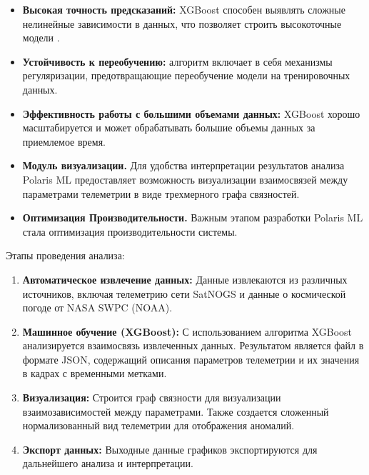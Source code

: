 \documentclass[14pt, a4paper]{extreport}
\begin{document}
    \begin{itemize}
        \item \textbf{Высокая точность предсказаний:} XGBoost способен выявлять сложные нелинейные зависимости в данных, что позволяет строить высокоточные модели \cite{behaviour_based_anomaly_detection}.
        \item \textbf{Устойчивость к переобучению:} алгоритм включает в себя механизмы регуляризации, предотвращающие переобучение модели на тренировочных данных.
        \item \textbf{Эффективность работы с большими объемами данных:} XGBoost хорошо масштабируется и может обрабатывать большие объемы данных за приемлемое время.
        \item \textbf{Модуль визуализации.} Для удобства интерпретации результатов анализа Polaris ML предоставляет возможность визуализации взаимосвязей между параметрами телеметрии в виде трехмерного графа связностей.
        \item \textbf{Оптимизация Производительности.} Важным этапом разработки Polaris ML стала оптимизация производительности системы.
    \end{itemize}

    Этапы проведения анализа:

    \begin{enumerate}[label=\arabic*.]
        \item \textbf{Автоматическое извлечение данных:}
        Данные извлекаются из различных источников, включая телеметрию сети SatNOGS и данные о космической погоде от NASA SWPC (NOAA).

        \item \textbf{Машинное обучение (XGBoost):}
        С использованием алгоритма XGBoost~\cite{xgboost_docs,boumghar_2018_enhanced} анализируется взаимосвязь извлеченных данных.
        Результатом является файл в формате JSON, содержащий описания параметров телеметрии и их значения в кадрах с временными метками.

        \item \textbf{Визуализация:}
        Строится граф связности для визуализации взаимозависимостей между параметрами.
        Также создается сложенный нормализованный вид телеметрии для отображения аномалий.

        \item \textbf{Экспорт данных:}
        Выходные данные графиков экспортируются для дальнейшего анализа и интерпретации.
    \end{enumerate}
\end{document}
